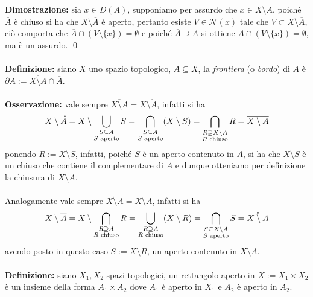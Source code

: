 \documentclass{article}
\begin{document}
\textbf{Dimostrazione:} sia $x \in D(A)$, supponiamo per assurdo che $x \in X \setminus \overline{A}$, poiché $\overline{A}$ è chiuso si ha che $X \setminus \overline{A}$ è aperto, pertanto esiste $V \in \mathcal{N}(x)$ tale che $V \subset X \setminus \overline{A}$, ciò comporta che $\overline{A} \cap (V \setminus \{x\}) = \emptyset$ e poiché $\overline{A} \supseteq A$ si ottiene $A \cap (V \setminus \{x\}) = \emptyset$, ma è un assurdo. \qed \\ \\
\textbf{Definizione:} siano $X$ uno spazio topologico, $A \subseteq X$, la \textit{frontiera} (o \textit{bordo}) di $A$ è $\partial A := \overline{X \setminus A} \cap \overline{A}$. \\ \\ 
\textbf{Osservazione:} vale sempre $\overline{X \setminus A} = X \setminus \mathring{A}$, infatti si ha 
\begin{gather}
    X \setminus \mathring{A} = X \setminus \bigcup_{\substack{S \subseteq A \\ S \text{ aperto}}} S = \bigcap_{\substack{S \subseteq A \\ S \text{ aperto}}} (X \setminus S) = \bigcap_{\substack{R \supseteq X \setminus A \\ R \text{ chiuso}}} R = \overline{X \setminus A} \notag
\end{gather}
ponendo $R := X \setminus S$, infatti, poiché $S$ è un aperto contenuto in $A$, si ha che $X \setminus S$ è un chiuso che contiene il complementare di $A$ e dunque otteniamo per definizione la chiusura di $X \setminus A$. \\ \\
Analogamente vale sempre $\mathring{X \setminus A} = X \setminus \overline{A}$, infatti si ha
\begin{gather}
    X \setminus \overline{A} = X \setminus \bigcap_{\substack{R \supseteq A \\ R \text{ chiuso}}} R = \bigcup_{\substack{R \supseteq A \\ R \text{ chiuso}}} (X \setminus R) = \bigcap_{\substack{S \subseteq X \setminus A \\ S \text{ aperto}}} S = \mathring{X \setminus A} \notag
\end{gather}
avendo posto in questo caso $S := X \setminus R$, un aperto contenuto in $X \setminus A$. \\ \\
\textbf{Definizione:} siano $X_1, X_2$ spazi topologici, un rettangolo aperto in $X := X_1 \times X_2$ è un insieme della forma $A_1 \times A_2$ dove $A_1$ è aperto in $X_1$ e $A_2$ è aperto in $A_2$. \\
\end{document}
